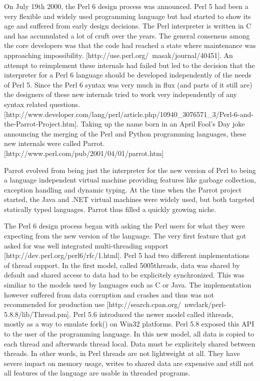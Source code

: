 \documentclass[bachelor,english]{hgbthesis}
\begin{document}
On July 19th 2000, the Perl 6 design process was announced. Perl 5 had been a very flexible and widely used programming language but had started to show its age and suffered from early design decisions. The Perl interpreter is written in C and has accumulated a lot of cruft over the years. The general consensus among the core developers was that the code had reached a state where maintenance was approaching impossibility. [http://use.perl.org/~masak/journal/40451]. An attempt to reimplement these internals had failed but led to the decision that the interpreter for a Perl 6 language should be developed independently of the needs of Perl 5. Since the Perl 6 syntax was very much in flux (and parts of it still are) the designers of these new internals tried to work very independently of any syntax related questions. [http://www.developer.com/lang/perl/article.php/10940\_3076571\_3/Perl-6-and-the-Parrot-Project.htm]. Taking up the name born in an April Fool's Day joke announcing the merging of the Perl and Python programming languages, these new internals were called Parrot. [http://www.perl.com/pub/2001/04/01/parrot.htm]

Parrot evolved from being just the interpreter for the new version of Perl to being a language independent virtual machine providing features like garbage collection, exception handling and dynamic typing. At the time when the Parrot project started, the Java and .NET virtual machines were widely used, but both targeted statically typed languages. Parrot thus filled a quickly growing niche.

The Perl 6 design process began with asking the Perl users for what they were expecting from the new version of the language. The very first feature that got asked for was well integrated multi-threading support [http://dev.perl.org/perl6/rfc/1.html]. Perl 5 had two different implementations of thread support. In the first model, called 5005threads, data was shared by default and shared access to data had to be explicitely synchronized. This was similiar to the models used by languages such as C or Java. The implementation however suffered from data corruption and crashes and thus was not recommended for production use [http://search.cpan.org/~nwclark/perl-5.8.8/lib/Thread.pm]. Perl 5.6 introduced the newer model called ithreads, mostly as a way to emulate fork() on Win32 platforms. Perl 5.8 exposed this API to the user of the programming language. In this new model, all data is copied to each thread and afterwards thread local. Data must be explicitely shared between threads. In other words, in Perl threads are not lightweight at all. They have severe impact on memory usage, writes to shared data are expensive and still not all features of the language are usable in threaded programs.
\end{document}
